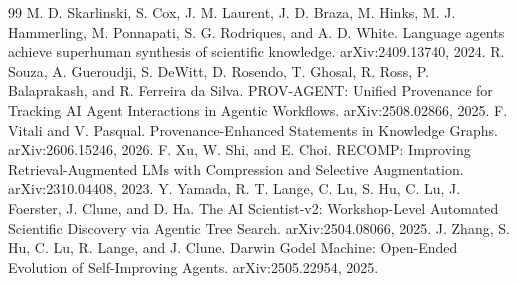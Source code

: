 \begin{thebibliography}{99}
 M. D. Skarlinski, S. Cox, J. M. Laurent, J. D. Braza, M. Hinks, M. J. Hammerling, M. Ponnapati, S. G. Rodriques, and A. D. White. Language agents achieve superhuman synthesis of scientific knowledge. arXiv:2409.13740, 2024.
 R. Souza, A. Gueroudji, S. DeWitt, D. Rosendo, T. Ghosal, R. Ross, P. Balaprakash, and R. Ferreira da Silva. PROV-AGENT: Unified Provenance for Tracking AI Agent Interactions in Agentic Workflows. arXiv:2508.02866, 2025.
 F. Vitali and V. Pasqual. Provenance-Enhanced Statements in Knowledge Graphs. arXiv:2606.15246, 2026.
 F. Xu, W. Shi, and E. Choi. RECOMP: Improving Retrieval-Augmented LMs with Compression and Selective Augmentation. arXiv:2310.04408, 2023.
 Y. Yamada, R. T. Lange, C. Lu, S. Hu, C. Lu, J. Foerster, J. Clune, and D. Ha. The AI Scientist-v2: Workshop-Level Automated Scientific Discovery via Agentic Tree Search. arXiv:2504.08066, 2025.
 J. Zhang, S. Hu, C. Lu, R. Lange, and J. Clune. Darwin Godel Machine: Open-Ended Evolution of Self-Improving Agents. arXiv:2505.22954, 2025.


\end{thebibliography}
